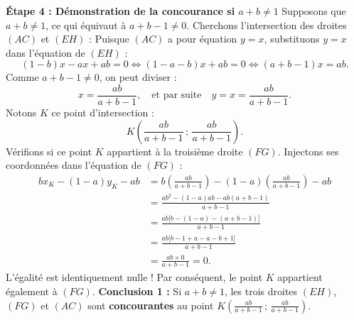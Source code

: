 \documentclass[11pt,a4paper]{article}
\begin{document}
\begin{correctionbox}
\textbf{Étape 4 : Démonstration de la concourance si $a + b \neq 1$}
Supposons que $a + b \neq 1$, ce qui équivaut à $a + b - 1 \neq 0$.
Cherchons l'intersection des droites $(AC)$ et $(EH)$ :
Puisque $(AC)$ a pour équation $y = x$, substituons $y = x$ dans l'équation de $(EH)$ :
\[
(1 - b)x - ax + ab = 0 \iff (1 - a - b)x + ab = 0 \iff (a + b - 1)x = ab.
\]
Comme $a + b - 1 \neq 0$, on peut diviser :
\[
x = \frac{ab}{a + b - 1}, \quad \text{et par suite} \quad y = x = \frac{ab}{a + b - 1}.
\]
Notons $K$ ce point d'intersection :
\[
K\left(\frac{ab}{a + b - 1} \,;\, \frac{ab}{a + b - 1}\right).
\]
Vérifions si ce point $K$ appartient à la troisième droite $(FG)$. Injectons ses coordonnées dans l'équation de $(FG)$ :
\begin{align*}
b x_K - (1 - a) y_K - ab &= b\left(\frac{ab}{a + b - 1}\right) - (1 - a)\left(\frac{ab}{a + b - 1}\right) - ab \\
&= \frac{ab^2 - (1 - a)ab - ab(a + b - 1)}{a + b - 1} \\
&= \frac{ab \bigl[ b - (1 - a) - (a + b - 1) \bigr]}{a + b - 1} \\
&= \frac{ab \bigl[ b - 1 + a - a - b + 1 \bigr]}{a + b - 1} \\
&= \frac{ab \times 0}{a + b - 1} = 0.
\end{align*}
L'égalité est identiquement nulle !
Par conséquent, le point $K$ appartient également à $(FG)$.
\textbf{Conclusion 1 :} Si $a + b \neq 1$, les trois droites $(EH)$, $(FG)$ et $(AC)$ sont \textbf{concourantes} au point $K\left(\frac{ab}{a + b - 1} \,;\, \frac{ab}{a + b - 1}\right)$.


\end{correctionbox}
\end{document}
